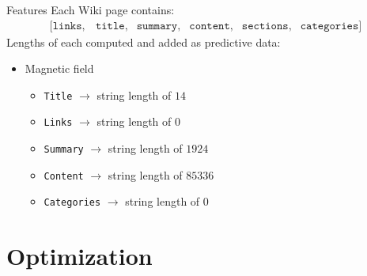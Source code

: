 \documentclass{beamer}
\begin{document}
\begin{frame}{Features}
    Each Wiki page contains:
        \[
            \begin{array}{llllll}
                [ \texttt{links}, & \texttt{title}, & \texttt{summary}, & \texttt{content}, & \texttt{sections}, & \texttt{categories}]
            \end{array}\]
     Lengths of each computed and added as predictive data: \\

        \begin{itemize}
            \item {\color{blue}Magnetic field}
	\begin{itemize}
		\item \texttt{Title} $\longrightarrow$ string length of {\color{red}$14$}
		\item \texttt{Links} $\longrightarrow$ string length of {\color{red}$0$}
		\item \texttt{Summary} $\longrightarrow$ string length of {\color{red}$1924$}
		\item \texttt{Content} $\longrightarrow$ string length of {\color{red}$85336$}
		\item \texttt{Categories} $\longrightarrow$ string length of {\color{red}$0$}
	\end{itemize}
        \end{itemize}
\end{frame}


\section{Optimization}
\end{document}
